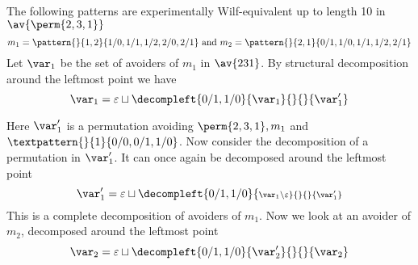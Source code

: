 
\subsection{}
\nextvar
The following patterns are experimentally Wilf-equivalent up to length 10 in
\(\av{\perm{2,3,1}}\)
\begin{equation*}
    m_1 = \pattern{}{1,2}{1/0,1/1,1/2,2/0,2/1} \text{ and }
    m_2 = \pattern{}{2,1}{0/1,1/0,1/1,1/2,2/1}
\end{equation*}
Let \(\scriptvar_1\) be the set of avoiders of \(m_1\) in \(\av{231}\). By structural decomposition
around the leftmost point we have
\begin{equation*}
    \scriptvar_1 = \varepsilon \sqcup
    \decompleft{0/1,1/0}{\scriptvar_1}{}{}{\scriptvar^\prime_1}
\end{equation*}

\noindent
Here \(\scriptvar^\prime_1\) is a permutation avoiding \(\perm{2,3,1}, m_1\)
and \(\textpattern{}{1}{0/0,0/1,1/0}\).
Now consider the decomposition of a permutation in \(\scriptvar^\prime_1\). It can
once again be decomposed around the leftmost point
\begin{equation*}
    \scriptvar^\prime_1 = \varepsilon \sqcup
    \decompleft{0/1,1/0}{\scriptstyle \scriptvar_1\setminus\varepsilon}{}{}{\scriptvar^\prime_1}
\end{equation*}
This is a complete decomposition of avoiders of \(m_1\). Now we
look at an avoider of \(m_2\), decomposed around the leftmost point
\begin{equation*}
    \scriptvar_2 = \varepsilon \sqcup
    \decompleft{0/1,1/0}{\scriptvar^\prime_2}{}{}{\scriptvar_2}
\end{equation*}


